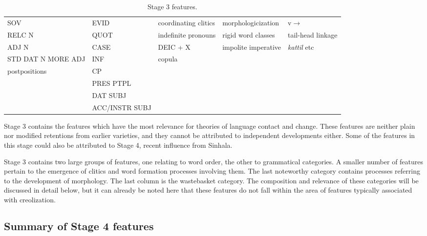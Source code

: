 \begin{table}[h!]
\centering
\begin{tabular}{p{2cm}p{2cm}p{2cm}p{2.5cm}p{2.5cm}} 
  SOV  			 & EVID 		&   coordinating clitics     & morphologicization  &v$\to$\V  \\
  RELC N    		& QUOT		&  indefinite pronouns      & rigid word classes & tail-head linkage \\
  ADJ N      		& CASE 		&  DEIC +  X    	& impolite imperative  & \emph{kattil} etc  \\
  STD DAT N MORE ADJ  	& INF 		&   copula\footnotemark{}				& 	& \\ 
  postpositions  	& CP 		&   				& 	&   \\ 
  		      & PRES PTPL 	&   				& 	& \\ 
			& DAT SUBJ &   				& 	& \\   
                        & ACC/INSTR SUBJ& 	&    
\end{tabular}
\caption{Stage 3 features.} 
\end{table}

Stage 3 contains the features which have the most relevance for theories of language contact and change. These features are neither plain nor modified retentions from earlier varieties, and they cannot be attributed to independent developments either. Some of the features in this stage could also be attributed to Stage 4, recent influence from Sinhala.

Stage 3 contains two large groups of features, one relating to word order, the other to grammatical categories. 
A smaller number of features pertain to the emergence of clitics and word formation processes involving them. 
The last noteworthy category contains processes referring to the development of morphology. The last column is the wastebasket category. 
The composition and relevance of these categories will be discussed in detail below, but it can already be noted here that these features do not fall within the area of features typically associated with creolization.

\subsection{Summary of Stage 4 features}

